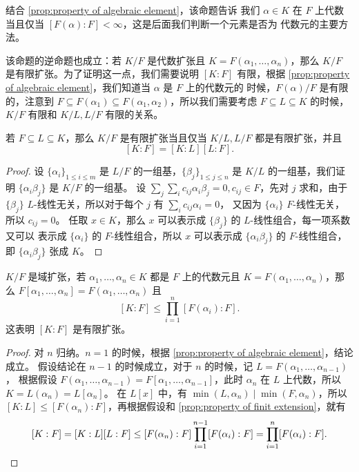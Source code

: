 结合 \autoref{prop:property of algebraic element}，该命题告诉
我们 $\alpha\in K$ 在 $F$ 上代数当且仅当 $[F(\alpha):F]<\infty$，这是后面我们判断一个元素是否为
代数元的主要方法。

该命题的逆命题也成立：若 $K/F$ 是代数扩张且 $K=F(\alpha_1,\dots,\alpha_n)$，那么
$K/F$ 是有限扩张。为了证明这一点，我们需要说明 $[K:F]$ 有限，根据
\autoref{prop:property of algebraic element}，我们知道当 $\alpha$ 是 $F$ 上的代数元的
时候，$F(\alpha)/F$ 是有限的，注意到
$F\subseteq F(\alpha_1)\subseteq F(\alpha_1,\alpha_2)$，所以我们需要考虑 $F\subseteq L\subseteq K$ 的时候，
$K/F$ 有限和 $K/L,L/F$ 有限的关系。

\begin{proposition}\label{prop:property of finit extension}
  若 $F\subseteq L\subseteq K$，那么 $K/F$ 是有限扩张当且仅当 $K/L,L/F$ 都是有限扩张，并且
  \[
    [K:F]=[K:L][L:F].  
  \]
\end{proposition}
\begin{proof}
  设 $\{\alpha_i\}_{1\leq i\leq m}$ 是 $L/F$ 的一组基，$\{\beta_j\}_{1\leq j\leq n}$
  是 $K/L$ 的一组基，我们证明 $\{\alpha_i\beta_j\}$ 是 $K/F$ 的一组基。
  设 $\sum_j\sum_i c_{ij}\alpha_i\beta_j=0,c_{ij}\in F$，先对 $j$ 求和，由于
  $\{\beta_j\}$ $L$-线性无关，所以对于每个 $j$ 有 $\sum_i c_{ij}\alpha_i=0$，
  又因为 $\{\alpha_i\}$ $F$-线性无关，所以 $c_{ij}=0$。
  任取 $x\in K$，那么 $x$ 可以表示成 $\{\beta_j\}$ 的 $L$-线性组合，每一项系数又可以
  表示成 $\{\alpha_i\}$ 的 $F$-线性组合，所以 $x$ 可以表示成 $\{\alpha_i\beta_j\}$
  的 $F$-线性组合，即 $\{\alpha_i\beta_j\}$ 张成 $K$。
\end{proof}

\begin{proposition}\label{prop:property of finitly generated extension}
  $K/F$ 是域扩张，若 $\alpha_1,\dots,\alpha_n\in K$ 都是 $F$ 上的代数元且
  $K=F(\alpha_1,\dots,\alpha_n)$，那么 $F[\alpha_1,\dots,\alpha_n]=F(\alpha_1,\dots,\alpha_n)$
  且
  \[
    [K:F]\leq \prod_{i=1}^n [F(\alpha_i):F].  
  \]
  这表明 $[K:F]$ 是有限扩张。
\end{proposition}
\begin{proof}
  对 $n$ 归纳。$n=1$ 的时候，根据 \autoref{prop:property of algebraic element}，结论成立。
  假设结论在 $n-1$ 的时候成立，对于 $n$ 的时候，记 $L=F(\alpha_1,\dots,\alpha_{n-1})$，
  根据假设 $F(\alpha_1,\dots,\alpha_{n-1})=F[\alpha_1,\dots,\alpha_{n-1}]$，此时
  $\alpha_n$ 在 $L$ 上代数，所以 $K=L(\alpha_n)=L[\alpha_n]$。
  在 $L[x]$ 中，有 $\min(L,\alpha_n)\mid \min(F,\alpha_n)$，所以
  $[K:L]\leq [F(\alpha_n):F]$，再根据假设和 \autoref{prop:property of finit extension}，就有
  \[
    [K:F] =[K:L][L:F]\leq [F(\alpha_n):F]\prod_{i=1}^{n-1}[F(\alpha_i):F]
    =\prod_{i=1}^n [F(\alpha_i):F].\qedhere
  \]
\end{proof}

